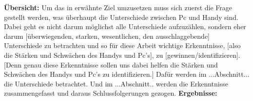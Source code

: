 \myTodo
\textbf{Übersicht:} %
Um das in  erwähnte Ziel umzusetzen muss sich zuerst die Frage gestellt werden, was überhaupt die Unterschiede zwischen Pc und Handy sind. Dabei geht es nicht darum möglichst alle Unterschiede aufzuzählen, sondern eher darum [überwiegenden, starken, wesentlichen, den ausschlaggebende] Unterschiede zu betrachten und so für diese Arbeit wichtige Erkenntnisse, [also die Stärken und Schwächen des Handys und Pc's], zu [gewinnen/identifizieren]. [Denn genau diese Erkenntnisse sollen uns dabei helfen die Stärken und Schwächen des Handys und Pc's zu identifizieren.]\newline%
Dafür werden im ...Abschnitt... die Unterschiede betrachtet.\newline%
Und im ...Abschnitt.. werden die Erkenntnisse zusammengefasst und daraus Schlussfolgerungen gezogen.\newline%
\textbf{Ergebnisse:}


